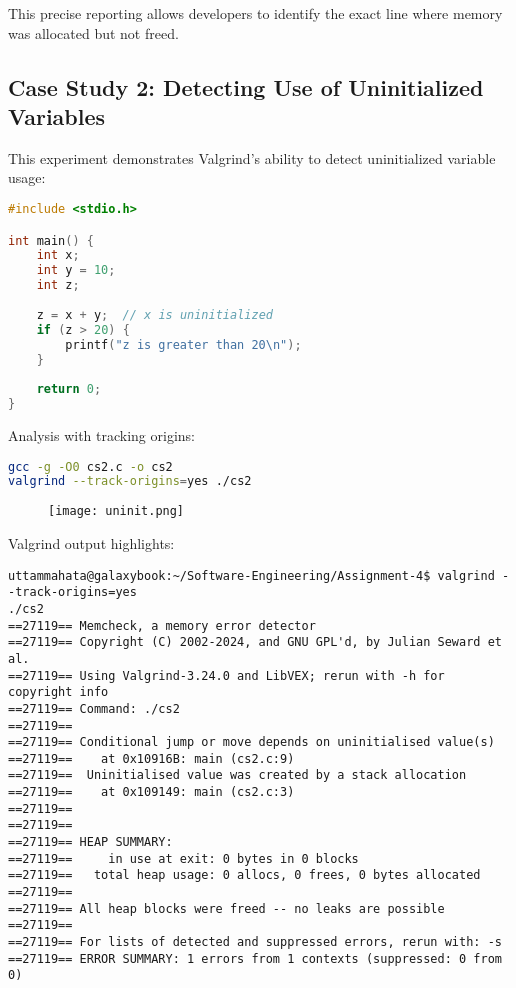 \documentclass[11pt,a4paper]{article}
\begin{document}
This precise reporting allows developers to identify the exact line where memory was allocated but not freed.

\subsection{Case Study 2: Detecting Use of Uninitialized Variables}

This experiment demonstrates Valgrind's ability to detect uninitialized variable usage:

\begin{lstlisting}[caption=Program using uninitialized variables, language=C]
#include <stdio.h>

int main() {
    int x;
    int y = 10;
    int z;
    
    z = x + y;  // x is uninitialized
    if (z > 20) {
        printf("z is greater than 20\n");
    }
    
    return 0;
}
\end{lstlisting}

Analysis with tracking origins:

\begin{lstlisting}[caption=Detecting uninitialized values with Valgrind, language=bash]
gcc -g -O0 cs2.c -o cs2
valgrind --track-origins=yes ./cs2
\end{lstlisting}

\begin{figure}
    \centering
    \texttt{[image: uninit.png]}
\end{figure}


Valgrind output highlights:
\begin{verbatim}
uttammahata@galaxybook:~/Software-Engineering/Assignment-4$ valgrind --track-origins=yes 
./cs2   
==27119== Memcheck, a memory error detector
==27119== Copyright (C) 2002-2024, and GNU GPL'd, by Julian Seward et al.
==27119== Using Valgrind-3.24.0 and LibVEX; rerun with -h for copyright info
==27119== Command: ./cs2
==27119== 
==27119== Conditional jump or move depends on uninitialised value(s)
==27119==    at 0x10916B: main (cs2.c:9)
==27119==  Uninitialised value was created by a stack allocation
==27119==    at 0x109149: main (cs2.c:3)
==27119== 
==27119== 
==27119== HEAP SUMMARY:
==27119==     in use at exit: 0 bytes in 0 blocks
==27119==   total heap usage: 0 allocs, 0 frees, 0 bytes allocated
==27119== 
==27119== All heap blocks were freed -- no leaks are possible
==27119== 
==27119== For lists of detected and suppressed errors, rerun with: -s
==27119== ERROR SUMMARY: 1 errors from 1 contexts (suppressed: 0 from 0)


\end{verbatim}
\end{document}
